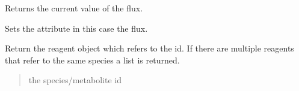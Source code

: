 \documentclass[letterpaper,12pt,english]{sphinxmanual}
\begin{document}
\begin{fulllineitems}
\begin{fulllineitems}
\end{fulllineitems}


\begin{fulllineitems}
\label{\detokenize{api/core:cbmpy.CBModel.Reaction.getValue}}
\pysigstartsignatures
\pysiglinewithargsret
{}
{}
{}
\pysigstopsignatures
\sphinxAtStartPar
Returns the current value of the flux.

\end{fulllineitems}


\begin{fulllineitems}
\label{\detokenize{api/core:cbmpy.CBModel.Reaction.setValue}}
\pysigstartsignatures
\pysiglinewithargsret
{}
{}
{}
\pysigstopsignatures
\sphinxAtStartPar
Sets the attribute  in this case the flux.

\end{fulllineitems}


\begin{fulllineitems}
\label{\detokenize{api/core:cbmpy.CBModel.Reaction.getReagentWithSpeciesRef}}
\pysigstartsignatures
\pysiglinewithargsret
{}
{}
{}
\pysigstopsignatures
\sphinxAtStartPar
Return the reagent object which refers to the  id. If there are multiple reagents that refer to the same species a list is returned.
\begin{quote}\begin{description}
\sphinxAtStartPar
{} \textendash{} the species/metabolite id

\end{description}\end{quote}

\end{fulllineitems}



\end{fulllineitems}
\end{document}
